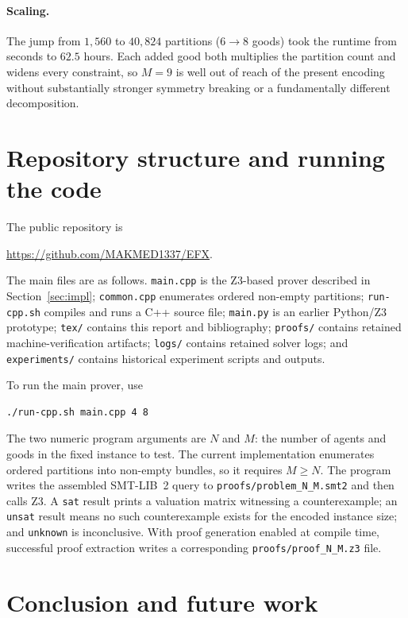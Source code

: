 \documentclass[11pt,a4paper]{article}
\theoremstyle{definition}
\theoremstyle{plain}
\newcommand{\agents}{N}
\newcommand{\goods}{M}
\begin{document}
\paragraph{Scaling.}
The jump from $1{,}560$ to $40{,}824$ partitions ($6\to 8$ goods) took the
runtime from seconds to $62.5$ hours. Each added good both multiplies the
partition count and widens every constraint, so $\goods=9$ is well out of reach
of the present encoding without substantially stronger symmetry breaking or a
fundamentally different decomposition.

\section{Repository structure and running the code}
\label{sec:repo}

The public repository is
\begin{center}
  \url{https://github.com/MAKMED1337/EFX}.
\end{center}
The main files are as follows. \texttt{main.cpp} is the Z3-based prover described
in Section~\ref{sec:impl}; \texttt{common.cpp} enumerates ordered non-empty
partitions; \texttt{run-cpp.sh} compiles and runs a C++ source file;
\texttt{main.py} is an earlier Python/Z3 prototype; \texttt{tex/} contains this
report and bibliography; \texttt{proofs/} contains retained machine-verification
artifacts; \texttt{logs/} contains retained solver logs; and \texttt{experiments/}
contains historical experiment scripts and outputs.

To run the main prover, use
\begin{lstlisting}[language=bash]
./run-cpp.sh main.cpp 4 8
\end{lstlisting}
The two numeric program arguments are $\agents$ and $\goods$: the number of
agents and goods in the fixed instance to test. The current implementation
enumerates ordered partitions into non-empty bundles, so it requires
$\goods\geq\agents$. The program writes the assembled SMT-LIB~2 query to
\texttt{proofs/problem\_\agents\_\goods.smt2} and then calls Z3. A
\texttt{sat} result prints a valuation matrix witnessing a counterexample; an
\texttt{unsat} result means no such counterexample exists for the encoded
instance size; and \texttt{unknown} is inconclusive. With proof generation
enabled at compile time, successful proof extraction writes a corresponding
\texttt{proofs/proof\_\agents\_\goods.z3} file.

\section{Conclusion and future work}
\label{sec:conclusion}
\end{document}
